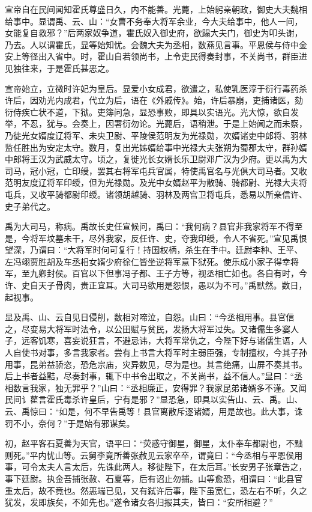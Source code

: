 \documentclass[]{article}
\begin{document}
宣帝自在民间闻知霍氏尊盛日久，内不能善。光薨，上始躬亲朝政，御史大夫魏相给事中。显谓禹、云、山：``女曹不务奉大将军余业，今大夫给事中，他人一间，女能复自救邪？''后两家奴争道，霍氏奴入御史府，欲蹋大夫门，御史为叩头谢，乃去。人以谓霍氏，显等始知忧。会魏大夫为丞相，数燕见言事。平恩侯与侍中金安上等径出入省中。时，霍山自若领尚书，上令吏民得奏封事，不关尚书，群臣进见独往来，于是霍氏甚恶之。

宣帝始立，立微时许妃为皇后。显爱小女成君，欲遣之，私使乳医淳于衍行毒药杀许后，因劝光内成君，代立为后，语在《外戚传》。始，许后暴崩，吏捕诸医，劾衍侍疾亡状不道，下狱。吏簿问急，显恐事败，即具以实语光。光大惊，欲自发举，不忍，犹与。会奏上，因署衍勿论。光薨后，语稍泄。于是上始闻之而未察，乃徙光女婿度辽将军、未央卫尉、平陵侯范明友为光禄勋，次婿诸吏中郎将、羽林监任胜出为安定太守。数月，复出光姊婿给事中光禄大夫张朔为蜀郡太守，群孙婿中郎将王汉为武威太守。顷之，复徙光长女婿长乐卫尉邓广汉为少府。更以禹为大司马，冠小冠，亡印绶，罢其右将军屯兵官属，特使禹官名与光俱大司马者。又收范明友度辽将军印绶，但为光禄勋。及光中女婿赵平为散骑、骑都尉、光禄大夫将屯兵，又收平骑都尉印绶。诸领胡越骑、羽林及两宫卫将屯兵，悉易以所亲信许、史子弟代之。

禹为大司马，称病。禹故长史任宣候问，禹曰：``我何病？县官非我家将军不得至是，今将军坟墓未干，尽外我家，反任许、史，夺我印绶，令人不省死。''宣见禹恨望深，乃谓曰：``大将军时何可复行！持国权柄，杀生在手中。廷尉李种、王平、左冯翊贾胜胡及车丞相女婿少府徐仁皆坐逆将军意下狱死。使乐成小家子得幸将军，至九卿封侯。百官以下但事冯子都、王子方等，视丞相亡如也。各自有时，今许、史自天子骨肉，贵正宜耳。大司马欲用是怨恨，愚以为不可。''禹默然。数日，起视事。

显及禹、山、云自见日侵削，数相对啼泣，自怨。山曰：``今丞相用事。县官信之，尽变易大将军时法令，以公田赋与贫民，发扬大将军过失。又诸儒生多窭人子，远客饥寒，喜妄说狂言，不避忌讳，大将军常仇之，今陛下好与诸儒生语，人人自使书对事，多言我家者。尝有上书言大将军时主弱臣强，专制擅权，今其子孙用事，昆弟益骄恣，恐危宗庙，灾异数见，尽为是也。其言绝痛，山屏不奏其书。后上书者益黠，尽奏封事，辄下中书令出取之，不关尚书，益不信人。''显曰：``丞相数言我家，独无罪乎？''山曰：``丞相廉正，安得罪？我家昆弟诸婿多不谨。又闻民间讠雚言霍氏毒杀许皇后，宁有是邪？''显恐急，即具以实告山、云、禹。山、云、禹惊曰：``如是，何不早告禹等！县官离散斥逐诸婿，用是故也。此大事，诛罚不小，奈何？''于是始有邪谋矣。

初，赵平客石夏善为天官，语平曰：``荧惑守御星，御星，太仆奉车都尉也，不黜则死。''平内忧山等。云舅李竟所善张赦见云家卒卒，谓竟曰：``今丞相与平恩侯用事，可令太夫人言太后，先诛此两人。移徙陛下，在太后耳。''长安男子张章告之，事下廷尉。执金吾捕张赦、石夏等，后有诏止勿捕。山等愈恐，相谓曰：``此县官重太后，故不竟也。然恶端已见，又有弑许后事，陛下虽宽仁，恐左右不听，久之犹发，发即族矣，不如先也。''遂令诸女各归报其夫，皆曰：``安所相避？''
\end{document}
